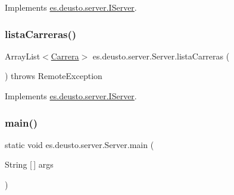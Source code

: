 Implements \mbox{\hyperlink{interfacees_1_1deusto_1_1server_1_1_i_server_a3cb0049dde89f2d81fcc883b19a0c6cf}{es.\+deusto.\+server.\+I\+Server}}.

\mbox{\label{classes_1_1deusto_1_1server_1_1_server_af62ce3462ec30a081db0009d2f2b33bb}} 
\subsubsection{\texorpdfstring{listaCarreras()}{listaCarreras()}}
{\footnotesize\ttfamily Array\+List$<$\mbox{\hyperlink{classes_1_1deusto_1_1server_1_1jdo_1_1_carrera}{Carrera}}$>$ es.\+deusto.\+server.\+Server.\+lista\+Carreras (\begin{DoxyParamCaption}{ }\end{DoxyParamCaption}) throws Remote\+Exception}



Implements \mbox{\hyperlink{interfacees_1_1deusto_1_1server_1_1_i_server_a13c17b07c8114d16130053aecdd455bb}{es.\+deusto.\+server.\+I\+Server}}.

\mbox{\label{classes_1_1deusto_1_1server_1_1_server_a750bb0d7dbd89246a3602f2e20d03fb5}} 
\subsubsection{\texorpdfstring{main()}{main()}}
{\footnotesize\ttfamily static void es.\+deusto.\+server.\+Server.\+main (\begin{DoxyParamCaption}\item[{String \mbox{[}$\,$\mbox{]}}]{args }\end{DoxyParamCaption})\hspace{0.3cm}{\ttfamily [static]}}

\mbox{\label{classes_1_1deusto_1_1server_1_1_server_a0f79b8db6904facdae94410e26bef452}} 

